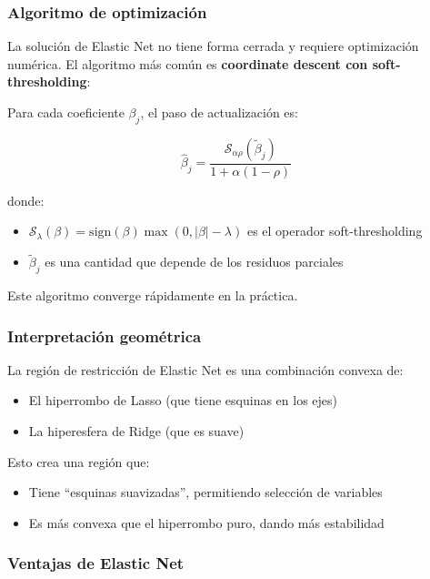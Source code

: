 \documentclass[
  doc,
  floatsintext,
  longtable,
  a4paper,
  nolmodern,
  notxfonts,
  notimes,
  12pt,
  colorlinks=true,linkcolor=blue,citecolor=blue,urlcolor=blue]{apa7}
\providecommand{\tightlist}{%
  \setlength{\itemsep}{0pt}\setlength{\parskip}{0pt}}
\begin{document}
\subsubsection{Algoritmo de
optimización}\label{algoritmo-de-optimizaciuxf3n}

La solución de Elastic Net no tiene forma cerrada y requiere
optimización numérica. El algoritmo más común es \textbf{coordinate
descent con soft-thresholding}:

Para cada coeficiente \(\beta_j\), el paso de actualización es:

\[
\hat{\beta}_j = \frac{\mathcal{S}_{\alpha\rho}(\tilde{\beta}_j)}{1 + \alpha(1-\rho)}
\]

donde:

\begin{itemize}
\tightlist
\item
  \(\mathcal{S}_{\lambda}(\beta) = \text{sign}(\beta) \max(0, |\beta| - \lambda)\)
  es el operador soft-thresholding
\item
  \(\tilde{\beta}_j\) es una cantidad que depende de los residuos
  parciales
\end{itemize}

Este algoritmo converge rápidamente en la práctica.

\subsubsection{Interpretación
geométrica}\label{interpretaciuxf3n-geomuxe9trica-2}

La región de restricción de Elastic Net es una combinación convexa de:

\begin{itemize}
\tightlist
\item
  El hiperrombo de Lasso (que tiene esquinas en los ejes)
\item
  La hiperesfera de Ridge (que es suave)
\end{itemize}

Esto crea una región que:

\begin{itemize}
\tightlist
\item
  Tiene ``esquinas suavizadas'', permitiendo selección de variables
\item
  Es más convexa que el hiperrombo puro, dando más estabilidad
\end{itemize}

\subsubsection{Ventajas de Elastic Net}\label{ventajas-de-elastic-net}
\end{document}
